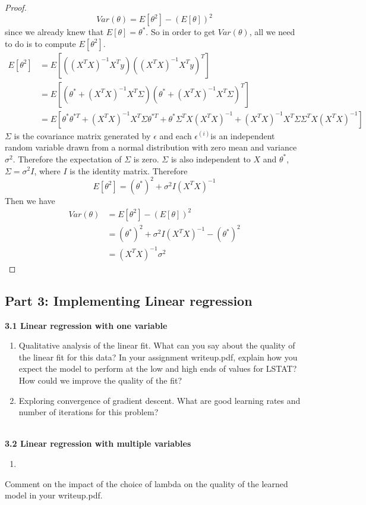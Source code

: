 \documentclass[]{book}
\theoremstyle{definition}
\begin{document}
\begin{enumerate}
\begin{proof}
	$$Var(\theta) = E[\theta^2] -(E[\theta])^2$$
	since we already knew that $E[\theta] = \theta^*$. So in order to get $Var(\theta)$, all we need to do is to compute $E[\theta^2]$.
	\begin{equation*}
	\begin{split}
	E[\theta^2] &= E[((X^T X)^{-1} X^T y)((X^T X)^{-1} X^T y)^T]\\
	&=E[(\theta^* + (X^T X)^{-1} X^T\varSigma) (\theta^* + (X^T X)^{-1} X^T\varSigma)^T ]\\
	&=E[\theta^* \theta^{*T} + (X^T X)^{-1} X^T \varSigma \theta^{*T} + \theta^* \varSigma^T X (X^T X)^{-1} + (X^T X)^{-1} X^T \varSigma \varSigma^T X (X^T X)^{-1}]
	\end{split}
	\end{equation*}
	$\varSigma$ is the covariance matrix generated by $\epsilon$ and each $\epsilon^{(i)}$is an independent random variable drawn from a normal distribution with zero mean and variance $\sigma^2$. Therefore the expectation of $\varSigma$ is zero. $\varSigma$ is also independent to $X$ and $\theta^*$, $\varSigma = \sigma^2 I$, where $I$ is the identity matrix. Therefore
	$$ E[\theta^2]= (\theta^*)^2 + \sigma^2 I (X^T X)^{-1}$$
	Then we have 
	\begin{equation*}
	\begin{split}
	Var(\theta) &= E[\theta^2] -(E[\theta])^2\\
	&=(\theta^*)^2 + \sigma^2 I (X^T X)^{-1} -(\theta^*)^2\\
	& =  (X^T X)^{-1} \sigma^2
	\end{split}
	\end{equation*}
\end{proof}
\end{enumerate}

\subsection*{Part 3: Implementing Linear regression}

\textbf{3.1 Linear regression with one variable}
\begin{enumerate}
	\item Qualitative analysis of the linear fit. What can you say about the quality of the linear fit for this data? In your assignment writeup.pdf, explain how you expect the model to perform at the low and high ends of values for LSTAT? How could we improve the quality of the fit?
    \item Exploring convergence of gradient descent. What are good learning rates and number of iterations for this problem?
\end{enumerate}
\quad \\
\textbf{3.2 Linear regression with multiple variables}


\begin{enumerate}
	\item 
\end{enumerate}

Comment on the impact of the choice of lambda on the quality of the learned model in your writeup.pdf.
\end{document}
